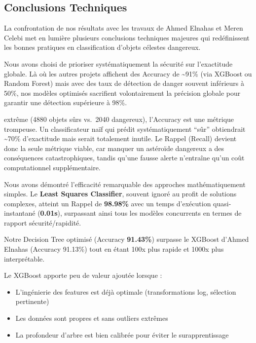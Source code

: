 \documentclass[11pt]{article}
\providecommand{\tightlist}{%
      \setlength{\itemsep}{0pt}\setlength{\parskip}{0pt}}
\begin{document}
\subsection{Conclusions Techniques}\label{conclusions-techniques}

La confrontation de nos résultats avec les travaux de Ahmed Elnahas et
Meren Celebi met en lumière plusieurs conclusions techniques majeures
qui redéfinissent les bonnes pratiques en classification d'objets
célestes dangereux.

Nous avons choisi de prioriser systématiquement la sécurité sur
l'exactitude globale. Là où les autres projets affichent des Accuracy de
\textasciitilde91\% (via XGBoost ou Random Forest) mais avec des taux de
détection de danger souvent inférieurs à 50\%, nos modèles optimisés
sacrifient volontairement la précision globale pour garantir une
détection supérieure à 98\%.

extrême (4880 objets sûrs vs.~2040 dangereux), l'Accuracy est une
métrique trompeuse. Un classificateur naïf qui prédit systématiquement
``sûr'' obtiendrait \textasciitilde70\% d'exactitude mais serait
totalement inutile. Le Rappel (Recall) devient donc la seule métrique
viable, car manquer un astéroïde dangereux a des conséquences
catastrophiques, tandis qu'une fausse alerte n'entraîne qu'un coût
computationnel supplémentaire.

Nous avons démontré l'efficacité remarquable des approches
mathématiquement simples. Le \textbf{Least Squares Classifier}, souvent
ignoré au profit de solutions complexes, atteint un Rappel de
\textbf{98.98\%} avec un temps d'exécution quasi-instantané
(\textbf{0.01s}), surpassant ainsi tous les modèles concurrents en
termes de rapport sécurité/rapidité.

Notre Decision Tree optimisé (Accuracy \textbf{91.43\%}) surpasse le
XGBoost d'Ahmed Elnahas (Accuracy 91.13\%) tout en étant 100x plus
rapide et 1000x plus interprétable.

Le XGBoost apporte peu de valeur ajoutée lorsque :

\begin{itemize}
  \tightlist
  \item
        L'ingénierie des features est déjà optimale (transformations log,
        sélection pertinente)
  \item
        Les données sont propres et sans outliers extrêmes
  \item
        La profondeur d'arbre est bien calibrée pour éviter le
        surapprentissage
\end{itemize}
\end{document}
